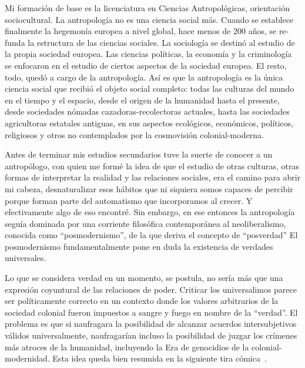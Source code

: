 \documentclass[a4paper,11pt]{book}
\theoremstyle{definition}
\begin{document}
Mi formación de base es la licenciatura en Ciencias Antropológicas, orientación sociocultural.
%
La antropología no es una ciencia social más.
%
Cuando se establece finalmente la hegemonía europea a nivel global, hace menos de 200 años, se re-funda la estructura de las ciencias sociales.
%
La sociología se destinó al estudio de la propia sociedad europea.
%
Las ciencias políticas, la economía y la criminología se enfocaron en el estudio de ciertos aspectos de la sociedad europea.
%
El resto, todo, quedó a cargo de la antropología.
%
Así es que la antropología es la única ciencia social que recibió el objeto social completo: todas las culturas del mundo en el tiempo y el espacio, desde el origen de la humanidad hasta el presente, desde sociedades nómadas cazadoras-recolectoras actuales, hasta las sociedades agricultoras estatales antiguas, en sus aspectos ecológicos, económicos, políticos, religiosos y otros no contemplados por la cosmovisión colonial-moderna.


Antes de terminar mis estudios secundarios tuve la suerte de conocer a un antropólogo, con quien me formé la idea de que el estudio de otras culturas, otras formas de interpretar la realidad y las relaciones sociales, era el camino para abrir mi cabeza, desnaturalizar esos hábitos que ni siquiera somos capaces de percibir porque forman parte del automatismo que incorporamos al crecer.
%
Y efectivamente algo de eso encontré.
%
Sin embargo, en ese entonces la antropología seguía dominada por una corriente filosófica contemporánea al neoliberalismo, conocida como ``posmodernismo'', de la que deriva el concepto de ``posverdad''
%
El posmodernismo fundamentalmente pone en duda la existencia de verdades universales.


Lo que se considera verdad en un momento, se postula, no sería más que una expresión coyuntural de las relaciones de poder.
%
Criticar los universalimos parece ser políticamente correcto en un contexto donde los valores arbitrarios de la sociedad colonial fueron impuestos a sangre y fuego en nombre de la ``verdad''.
%
El problema es que si naufragara la posibilidad de alcanzar acuerdos intersubjetivos válidos universalmente, naufragarían incluso la posibilidad de juzgar los crímenes más atroces de la humanidad, incluyendo la Era de genocidios de la colonial-modernidad.
%
Esta idea queda bien resumida en la siguiente tira cómica~\cite{fig:sidewalk_bubblegum_1997}.

\end{document}
